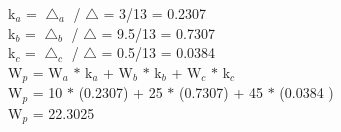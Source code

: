 \documentclass{article}[12pt]
\begin{document}
{    k$_{a}$ = $\bigtriangleup _{a}$ / $\bigtriangleup$ = 3/13 = 0.2307 \\
    k$_{b}$ = $\bigtriangleup _{b}$ / $\bigtriangleup$ = 9.5/13 = 0.7307 \\
    k$_{c}$ = $\bigtriangleup _{c}$ / $\bigtriangleup$ = 0.5/13 = 0.0384 \\

    W$_{p}$ = W$_{a}$ $\ast$ k$_{a}$ + W$_{b}$ $\ast$ k$_{b}$ + W$_{c}$ $\ast$ k$_{c}$ \\
    W$_{p}$ = 10 $\ast$ (0.2307) + 25 $\ast$ (0.7307) + 45 $\ast$ (0.0384 ) \\
    W$_{p}$ = 22.3025 \\
}
\end{document}

